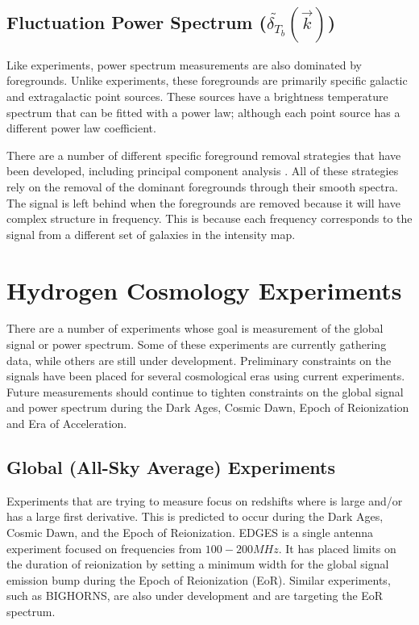 \subsection{Fluctuation Power Spectrum ($ \tilde{ \delta_{T_b} } ( \vec{k} )$)}

Like \avgdtb experiments, power spectrum measurements are also dominated by foregrounds. Unlike \avgdtb experiments, these foregrounds are primarily specific galactic and extragalactic point sources. These sources have a brightness temperature spectrum that can be fitted with a power law; although each point source has a different power law coefficient. 

There are a number of different specific foreground removal strategies that have been developed, including principal component analysis \cite{masui_2012}\cite{switzer_2013}. All of these strategies rely on the removal of the dominant foregrounds through their smooth spectra. The \cm signal is left behind when the foregrounds are removed because it will have complex structure in frequency. This is because each frequency corresponds to the signal from a different set of galaxies in the intensity map. 



\section{Hydrogen \cm Cosmology Experiments} \label{Sec:cm_expts}

There are a number of experiments whose goal is measurement of the \cm global signal or power spectrum. Some of these experiments are currently gathering data, while others are still under development. Preliminary constraints on the \cm signals have been placed for several cosmological eras using current experiments. Future measurements should continue to tighten constraints on the \cm global signal and \cm power spectrum during the Dark Ages, Cosmic Dawn, Epoch of Reionization and Era of Acceleration. 


\subsection{Global (All-Sky Average) Experiments}

Experiments that are trying to measure \avgdtb focus on redshifts where \avgdtb is large and/or has a large first derivative. This is predicted to occur during the Dark Ages, Cosmic Dawn, and the Epoch of Reionization. EDGES \cite{bowman_2008} is a single antenna experiment focused on frequencies from $100-200 MHz$. It has placed limits on the duration of reionization by setting a minimum width for the \cm global signal emission bump during the Epoch of Reionization (EoR). Similar experiments, such as BIGHORNS\cite{bighorns}\cite{sokolowski_2015}, are also under development and are targeting the EoR spectrum.  

